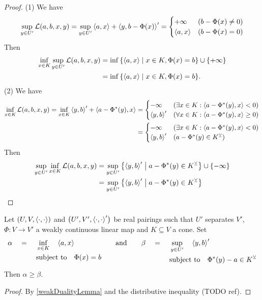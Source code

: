 \begin{proof}
(1) We have
\[ \sup_{y\in U'} \mathcal{L}(a,b,x,y) = \sup_{y\in U'} \left\langle a,x \right\rangle + \left\langle y,b - \Phi(x) \right\rangle' = \begin{cases}
+\infty & (b - \Phi(x) \neq 0) \\
\left\langle a,x \right\rangle & (b - \Phi(x) = 0)
\end{cases} \]
Then
\begin{align*}
\inf_{x\in K}\sup_{y\in U'} \mathcal{L}(a,b,x,y) &= \inf\setbuilder{\pair{a,x}}{x\in K, \Phi(x) = b} \cup\{+\infty\} \\
&= \inf\setbuilder{\pair{a,x}}{x\in K, \Phi(x) = b}.
\end{align*}
(2) We have
\begin{align*}
\inf_{x\in K} \mathcal{L}(a,b,x,y) = \inf_{x\in K} \left\langle y,b \right\rangle' + \left\langle a-\Phi^*(y), x \right\rangle &= \begin{cases}
- \infty & (\exists x\in K: \left\langle a-\Phi^*(y), x \right\rangle < 0) \\
\left\langle y,b \right\rangle' & (\forall x\in K: \left\langle a-\Phi^*(y), x \right\rangle \geq 0) \\
\end{cases} \\
&= \begin{cases}
- \infty & (\exists x\in K: \left\langle a-\Phi^*(y), x \right\rangle < 0) \\
\left\langle y,b \right\rangle' & (a-\Phi^*(y)\in K^\veebar) \\
\end{cases}
\end{align*}
Then
\begin{align*}
\sup_{y\in U'}\inf_{x\in K} \mathcal{L}(a,b,x,y) &= \sup_{y\in U'} \setbuilder{\pair{y,b}'}{a-\Phi^*(y) \in K^\pairingAligned} \cup \{-\infty\} \\
&= \sup_{y\in U'} \setbuilder{\pair{y,b}'}{a-\Phi^*(y) \in K^\pairingAligned}
\end{align*}
\end{proof}

\begin{proposition}
Let $\sSet{U,V,\pair{\cdot,\cdot}}$ and $\sSet{U',V',\pair{\cdot,\cdot}'}$ be real pairings such that $U'$ separates $V'$, $\Phi: V\to V'$ a weakly continuous linear map and $K\subseteq V$ a cone.
Set
\[ \alpha \quad=\quad \begin{aligned}[t]
&\inf_{x\in K} \quad  \left\langle a,x \right\rangle \\
&\text{subject to} \quad  \Phi(x) = b
\end{aligned}\qquad \text{and}\qquad \beta \quad=\quad \begin{aligned}[t]
&\sup_{y\in U'} \quad  \left\langle y,b \right\rangle' \\
&\text{subject to} \quad  \Phi^*(y) - a \in K^\veebar
\end{aligned} \]
Then $\alpha \geq \beta$.
\end{proposition}
\begin{proof}
By \ref{weakDualityLemma} and the distributive inequality (TODO ref).
\end{proof}

